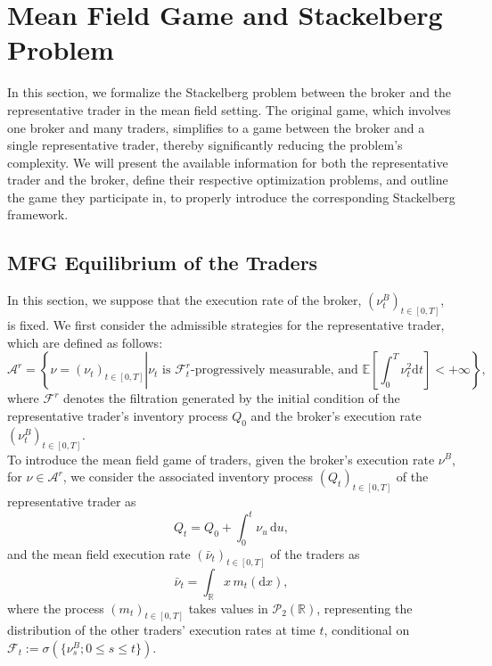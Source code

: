 \documentclass[10pt]{article}
\def\d{\mathrm{d}}
\begin{document}
\section{Mean Field Game and Stackelberg Problem}\label{section_comments_limitations}

In this section, we formalize the Stackelberg problem between the broker and the representative trader in the mean field setting. The original game, which involves one broker and many traders, simplifies to a game between the broker and a single representative trader, thereby significantly reducing the problem's complexity. We will present the available information for both the representative trader and the broker, define their respective optimization problems, and outline the game they participate in, to properly introduce the corresponding Stackelberg framework.


\subsection{MFG Equilibrium of the Traders}\label{section_mfg_equilibrium_for_traders}
In this section, we suppose that the execution rate of the broker, \( (\nu^B_t)_{t \in [0,T]} \), is fixed. We first consider the admissible strategies for the representative trader, which are defined as follows:
\[
\mathcal{A}^r = \left\{ \nu = (\nu_t)_{t \in [0,T]} \left| \nu_t \text{ is } \mathcal{F}^{r}_t \text{-progressively measurable, and } \mathbb{E} \left[ \int_0^T \nu_t^2 \d t \right] < +\infty \right. \right\},
\]
where \( \mathcal{F}^{r} \) denotes the filtration generated by the initial condition of the representative trader's inventory process \( Q_0 \) and the broker's execution rate \( (\nu^B_t)_{t \in [0,T]} \).\\

To introduce the mean field game of traders, given the broker’s execution rate \( \nu^B \), for \( \nu \in \mathcal{A}^r \), we consider the associated inventory process \( (Q_t)_{t \in [0,T]} \) of the representative trader as
\[
Q_t = Q_0 + \int_0^t \nu_u \, \d u,
\]
and the mean field execution rate \( (\bar \nu_t)_{t \in [0,T]} \) of the traders as
\[
\bar \nu_t = \int_{\mathbb{R}} x\, m_t(\d x),
\]
where the process \( (m_t)_{t \in [0,T]} \) takes values in \( \mathcal{P}_2 (\mathbb{R}) \), representing the distribution of the other traders' execution rates at time \( t \), conditional on \( \mathcal{F}_t := \sigma(\{\nu^B_s ; 0 \leq s \leq t\}) \).\\
\end{document}
